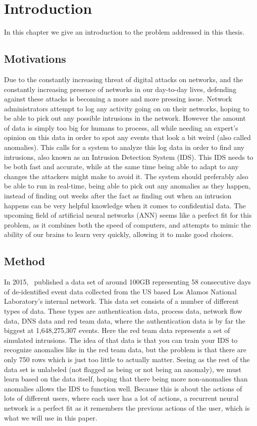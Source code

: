 \chapter{Introduction}\label{ch:introduction}
In this chapter we give an introduction to the problem addressed in this thesis.


\section{Motivations}
Due to the constantly increasing threat of digital attacks on networks, and the constantly increasing presence of networks in our day-to-day lives, defending against these attacks is becoming a more and more pressing issue. Network administrators attempt to log any activity going on on their networks, hoping to be able to pick out any possible intrusions in the network. However the amount of data is simply too big for humans to process, all while needing an expert's opinion on this data in order to spot any events that look a bit weird (also called anomalies). This calls for a system to analyze this log data in order to find any intrusions, also known as an Intrusion Detection System (IDS). This IDS needs to be both fast and accurate, while at the same time being able to adapt to any changes the attackers might make to avoid it. The system should preferably also be able to run in real-time, being able to pick out any anomalies as they happen, instead of finding out weeks after the fact as finding out when an intrusion happens can be very helpful knowledge when it comes to confidential data. The upcoming field of artificial neural networks (ANN) seems like a perfect fit for this problem, as it combines both the speed of computers, and attempts to mimic the ability of our brains to learn very quickly, allowing it to make good choices.

\section{Method}
In 2015,~\cite{akent-2015-enterprise-data} published a data set of around 100GB representing 58 consecutive days of de-identified event data collected from the US based Los Alamos National Laboratory's internal network. This data set consists of a number of different types of data. These types are authentication data, process data, network flow data, DNS data and red team data, where the authentication data is by far the biggest at 1,648,275,307 events. Here the red team data represents a set of simulated intrusions. The idea of that data is that you can train your IDS to recognize anomalies like in the red team data, but the problem is that there are only 750 rows which is just too little to actually matter. Seeing as the rest of the data set is unlabeled (not flagged as being or not being an anomaly), we must learn based on the data itself, hoping that there being more non-anomalies than anomalies allows the IDS to function well.
Because this is about the actions of lots of different users, where each user has a lot of actions, a recurrent neural network is a perfect fit as it remembers the previous actions of the user, which is what we will use in this paper.


